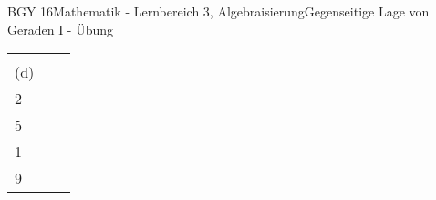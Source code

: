 \documentclass[oneside,openany,headings=optiontotoc,11pt,numbers=noenddot]{scrreprt}
\begin{document}
\begin{worksheet}{BGY 16}{Mathematik - Lernbereich 3, Algebraisierung}{Gegenseitige Lage von Geraden I - Übung}
\begin{framed}
\begin{tabularx}{\textwidth}{lXX}
				&&\\
				(d) & \(g: \vec{x} = \left(\begin{array}{c}4\\2\end{array}\right) + r\left(\begin{array}{c}-5\\5\end{array}\right)\) &	\(h: \vec{x} = \left(\begin{array}{c}5\\1\end{array}\right) + t\left(\begin{array}{c}4\\9\end{array}\right)\)
			\end{tabularx}
		\end{framed}
	\end{worksheet}
\end{document}
